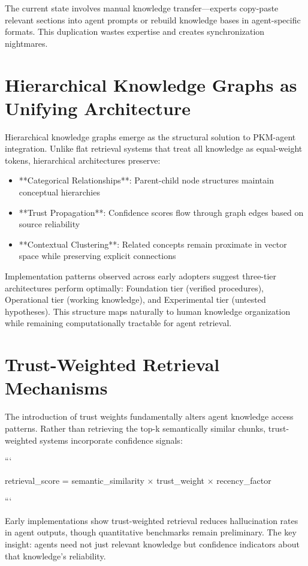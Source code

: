 \documentclass[a4paper,11pt]{article}
\begin{document}
The current state involves manual knowledge transfer—experts copy-paste relevant sections into agent prompts or rebuild knowledge bases in agent-specific formats. This duplication wastes expertise and creates synchronization nightmares.


\section{Hierarchical Knowledge Graphs as Unifying Architecture}

Hierarchical knowledge graphs emerge as the structural solution to PKM-agent integration. Unlike flat retrieval systems that treat all knowledge as equal-weight tokens, hierarchical architectures preserve:


\begin{itemize}
  \item **Categorical Relationships**: Parent-child node structures maintain conceptual hierarchies
  \item **Trust Propagation**: Confidence scores flow through graph edges based on source reliability
  \item **Contextual Clustering**: Related concepts remain proximate in vector space while preserving explicit connections
\end{itemize}

Implementation patterns observed across early adopters suggest three-tier architectures perform optimally: Foundation tier (verified procedures), Operational tier (working knowledge), and Experimental tier (untested hypotheses). This structure maps naturally to human knowledge organization while remaining computationally tractable for agent retrieval.


\section{Trust-Weighted Retrieval Mechanisms}

The introduction of trust weights fundamentally alters agent knowledge access patterns. Rather than retrieving the top-k semantically similar chunks, trust-weighted systems incorporate confidence signals:


```

retrieval\_score = semantic\_similarity × trust\_weight × recency\_factor

```


Early implementations show trust-weighted retrieval reduces hallucination rates in agent outputs, though quantitative benchmarks remain preliminary. The key insight: agents need not just relevant knowledge but confidence indicators about that knowledge's reliability.
\end{document}
